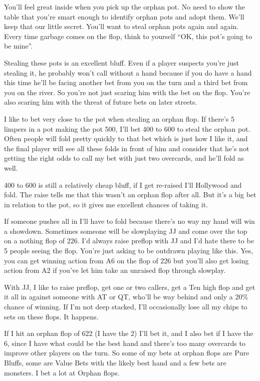 You'll feel great inside when you pick up the orphan pot. No need
to show the table that you're smart enough to identify orphan
pots and adopt them. We'll keep that our little secret. You'll want to
steal orphan pots again and again. Every time garbage comes on the flop,
think to yourself ``OK, this pot's going to be mine''.

Stealing these pots is an excellent bluff. Even if a player
suspects you're just stealing it, he probably won't call without
a hand because if you do have a hand this time he'll be facing
another bet from you on the turn and a third bet from you on the
river. So you're not just scaring him with the bet on the flop.
You're also scaring him with the threat of future bets on later
streets.

I like to bet very close to the pot when stealing an orphan flop.
If there's 5 limpers in a pot making the pot 500, I'll bet 400 to 600
to steal the orphan pot. Often people will fold pretty quickly to that
bet which is just how I like it, and the final player will see all these
folds in front of him and consider that he's not getting the right odds
to call my bet with just two overcards, and he'll fold as well.

400 to 600 is still a relatively cheap bluff, if I get re-raised I'll
Hollywood and fold. The raise tells me that this wasn't an orphan flop
after all. But it's a big bet in relation to the pot, so it
gives me excellent chances of taking it.

If someone pushes all in I'll have to fold because there's no way my
hand will win a showdown. Sometimes someone will be
slowplaying JJ and come over the top on a nothing flop of 226. I'd always
raise preflop with JJ and I'd hate there to be 5 people seeing the flop.
You're just asking to be outdrawn playing like this. Yes, you can get
winning action from A6 on the flop of 226 but you'll also get
losing action from A2 if you've let him take an unraised flop
through slowplay.

With JJ, I like to raise preflop, get one or two callers, get a Ten
high flop and get it all in against someone with AT or QT, who'll be
way behind and only a 20\% chance of winning. If I'm not deep stacked,
I'll occasionally lose all my chips to sets on these flops. It happens.

If I hit an orphan flop of 622 (I have the 2) I'll
bet it, and I also bet if I have the 6, since I have
what could be the best hand and there's too many overcards to improve
other players on the turn. So some of my bets at orphan flops are
Pure Bluffs, some are Value Bets with the likely best hand and a few
bets are monsters. I bet a lot at Orphan flops.

